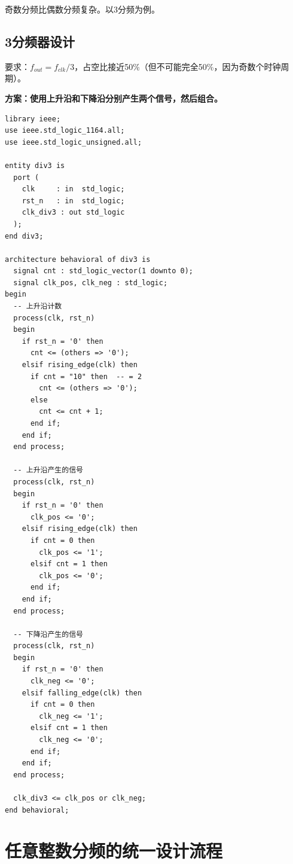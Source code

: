 奇数分频比偶数分频复杂。以3分频为例。

\subsection{3分频器设计}

要求：$f_{out} = f_{clk} / 3$，占空比接近50\%（但不可能完全50\%，因为奇数个时钟周期）。

\textbf{方案：使用上升沿和下降沿分别产生两个信号，然后组合。}

\begin{lstlisting}[caption={3分频器VHDL实现（占空比50\%）}]
library ieee;
use ieee.std_logic_1164.all;
use ieee.std_logic_unsigned.all;

entity div3 is
  port (
    clk     : in  std_logic;
    rst_n   : in  std_logic;
    clk_div3 : out std_logic
  );
end div3;

architecture behavioral of div3 is
  signal cnt : std_logic_vector(1 downto 0);
  signal clk_pos, clk_neg : std_logic;
begin
  -- 上升沿计数
  process(clk, rst_n)
  begin
    if rst_n = '0' then
      cnt <= (others => '0');
    elsif rising_edge(clk) then
      if cnt = "10" then  -- = 2
        cnt <= (others => '0');
      else
        cnt <= cnt + 1;
      end if;
    end if;
  end process;

  -- 上升沿产生的信号
  process(clk, rst_n)
  begin
    if rst_n = '0' then
      clk_pos <= '0';
    elsif rising_edge(clk) then
      if cnt = 0 then
        clk_pos <= '1';
      elsif cnt = 1 then
        clk_pos <= '0';
      end if;
    end if;
  end process;

  -- 下降沿产生的信号
  process(clk, rst_n)
  begin
    if rst_n = '0' then
      clk_neg <= '0';
    elsif falling_edge(clk) then
      if cnt = 0 then
        clk_neg <= '1';
      elsif cnt = 1 then
        clk_neg <= '0';
      end if;
    end if;
  end process;

  clk_div3 <= clk_pos or clk_neg;
end behavioral;
\end{lstlisting}

\section{任意整数分频的统一设计流程}

